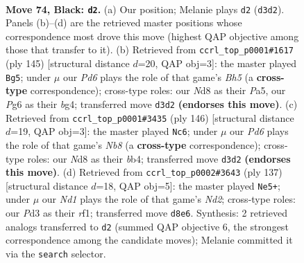 \documentclass[11pt]{article}
\begin{document}
\clearpage

\begin{figure}[p]\centering
\begin{subfigure}{0.46\textwidth}\centering
\resizebox{\linewidth}{!}{%
\newchessgame
\chessboard[
  setfen={3n4/2k3p1/1p4p1/p1p5/2P5/KP1p4/8/8 b - - 1 74},
  showmover=false,
  pgfstyle=straightmove, color=movearrow, markmove={d3-d2}
]}
\caption{}
\end{subfigure}\hfill
\begin{subfigure}{0.46\textwidth}\centering
\resizebox{\linewidth}{!}{%
\newchessgame
\chessboard[
  setfen={8/8/p2k4/p2p4/P2Pp1Bb/4P3/3K4/8 b - - 29 73},
  showmover=false,
  pgfstyle=straightmove, color=movearrow, markmove={h4-g5}
]}
\caption{}
\end{subfigure}
\\[4pt]
\begin{subfigure}{0.46\textwidth}\centering
\resizebox{\linewidth}{!}{%
\newchessgame
\chessboard[
  setfen={1N6/8/4k1p1/7p/1b2KP1P/p5P1/P7/8 w - - 15 74},
  showmover=false,
  pgfstyle=straightmove, color=movearrow, markmove={b8-c6}
]}
\caption{}
\end{subfigure}\hfill
\begin{subfigure}{0.46\textwidth}\centering
\resizebox{\linewidth}{!}{%
\newchessgame
\chessboard[
  setfen={8/3nk3/3p2p1/2pP2P1/1p2P3/3K4/8/5R2 b - - 4 69},
  showmover=false,
  pgfstyle=straightmove, color=movearrow, markmove={d7-e5}
]}
\caption{}
\end{subfigure}
\caption{\textbf{Move 74, Black: \texttt{d2}.} (a) Our position; Melanie plays \texttt{d2} (\texttt{d3d2}). Panels (b)--(d) are the retrieved master positions whose correspondence most drove this move (highest QAP objective among those that transfer to it). (b) Retrieved from \texttt{ccrl\_top\_p0001\#1617} (ply 145) [structural distance $d$=20, QAP obj=3]: the master played \texttt{Bg5}; under $\mu$ our \emph{Pd6} plays the role of that game's \emph{Bh5} (a \textbf{cross-type} correspondence); cross-type roles: our \emph{N}d8 as their \emph{P}a5, our \emph{P}g6 as their \emph{b}g4; transferred move \texttt{d3d2} \textbf{(endorses this move)}. (c) Retrieved from \texttt{ccrl\_top\_p0001\#3435} (ply 146) [structural distance $d$=19, QAP obj=3]: the master played \texttt{Nc6}; under $\mu$ our \emph{Pd6} plays the role of that game's \emph{Nb8} (a \textbf{cross-type} correspondence); cross-type roles: our \emph{N}d8 as their \emph{b}b4; transferred move \texttt{d3d2} \textbf{(endorses this move)}. (d) Retrieved from \texttt{ccrl\_top\_p0002\#3643} (ply 137) [structural distance $d$=18, QAP obj=5]: the master played \texttt{Ne5+}; under $\mu$ our \emph{Nd1} plays the role of that game's \emph{Nd2}; cross-type roles: our \emph{P}d3 as their \emph{r}f1; transferred move \texttt{d8e6}. Synthesis: 2 retrieved analogs transferred to \texttt{d2} (summed QAP objective 6, the strongest correspondence among the candidate moves); Melanie committed it via the \texttt{search} selector.}
\label{fig:thought-m147}
\end{figure}
\end{document}
